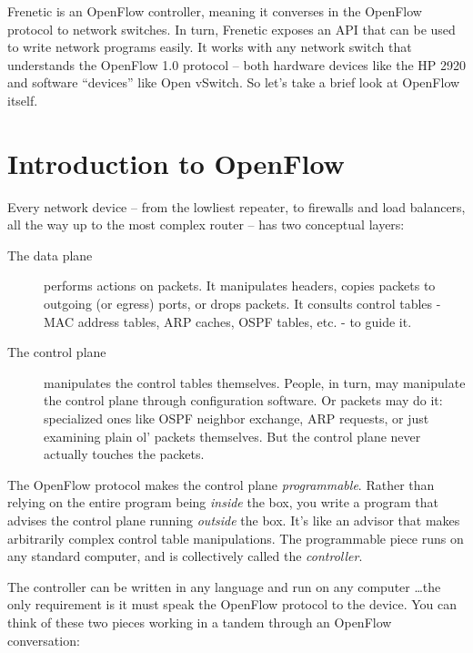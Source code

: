 Frenetic is an OpenFlow controller, meaning it converses in the OpenFlow protocol to network switches.  
In turn, Frenetic exposes an API that can be used to write network programs easily.
It works with any network switch that understands the OpenFlow 1.0 protocol -- 
both hardware devices like the HP 2920 and software ``devices'' like Open vSwitch.  
So let's take a brief look at OpenFlow itself.

\section{Introduction to OpenFlow}

Every network device -- from the lowliest repeater, to firewalls and load balancers, all the way up to the most complex router -- has two conceptual layers:

\begin{description}
\item[The data plane] performs actions on packets.   
It manipulates headers, copies packets to outgoing (or egress) ports, or drops packets.
It consults control tables - MAC address tables, ARP caches, OSPF tables, etc. - to guide it.  
\item[The control plane] manipulates the control tables themselves.
People, in turn, may manipulate the control plane through configuration software.
Or packets may do it: specialized ones like OSPF neighbor exchange, ARP requests, or just examining plain ol'
packets themselves.
But the control plane never actually touches the packets.
\end{description}

The OpenFlow protocol makes the control plane \textit{programmable}.
Rather than relying on the entire program being \emph{inside} the box, you write a program that 
advises the control plane
running \emph{outside} the box.
It's like an advisor that makes arbitrarily complex control table manipulations.  
The programmable piece runs on any standard computer, and is collectively called the \textit{controller}.  

The controller can be written in any language and run on any computer \ldots the only requirement 
is it must speak the
OpenFlow protocol to the device.  
You can think of these two pieces working in a tandem through an OpenFlow conversation:

